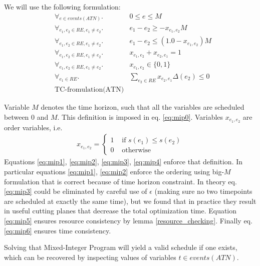 We will use the following formulation:
\begin{align}
\label{eq:mip0} & \forall_{e \in events(ATN)}.              & 0 \leq e \leq M \\
\label{eq:mip1} & \forall_{e_1, e_2 \in RE, e_1 \neq e_2}. & e_1 - e_2 \geq - x_{e_1,e_2} M \\
\label{eq:mip2} & \forall_{e_1, e_2 \in RE, e_1 \neq e_2}. & e_1 - e_2 \leq (1.0 - x_{e_1,e_2}) M\\
\label{eq:mip3} & \forall_{e_1, e_2 \in RE, e_1 \neq e_2}. & x_{e_1,e_2} + x_{e_2,e_1}  = 1\\
\label{eq:mip4} & \forall_{e_1, e_2 \in RE, e_1 \neq e_2}. & x_{e_1,e_2} \in \{ 0, 1 \} \\
\label{eq:mip5} & \forall_{e_1 \in RE}.                    & \sum_{e_2 \in RE} x_{e_2, e_1} \Delta(e_2) \leq 0\\
\label{eq:mip6} & \text{TC-fromulation(ATN)}
\end{align}

Variable $M$ denotes the time horizon, such that all the variables are scheduled between $0$ and $M$. This definition is imposed in eq. \ref{eq:mip0}.
Variables $x_{e_1,e_2}$ are order variables, i.e.
\begin{align*}
x_{e_1, e_2} = \begin{cases}
1 &\text{ if }s(e_1) \leq s(e_2) \\
0 &\text{ otherwise}
\end{cases}
\end{align*}
Equations \ref{eq:mip1}, \ref{eq:mip2}, \ref{eq:mip3}, \ref{eq:mip4} enforce that definition. In particular equations \ref{eq:mip1}, \ref{eq:mip2} enforce the ordering using big-$M$ formulation that is correct because of time horizon constraint. In theory eq. \ref{eq:mip3} could be eliminated by careful use of $\epsilon$ (making sure no two timepoints are scheduled at exactly the same time), but we found that in practice they result in useful cutting planes that decrease the total optimization time. Equation \ref{eq:mip5} ensures resource consistency by lemma \ref{resource_checking}. Finally eq. \ref{eq:mip6} ensures time consistency.

Solving that Mixed-Integer Program will yield a valid schedule if one exists, which can be recovered by inspecting values of variables $t \in events(ATN)$.


